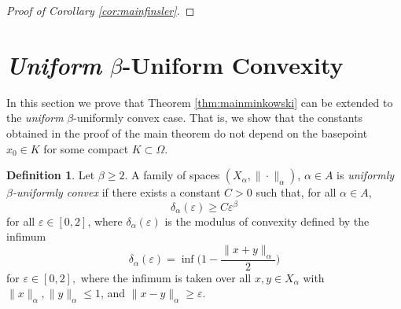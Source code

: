 \documentclass[letterpaper, 11pt, reqno]{amsart}
\theoremstyle{definition}
\newtheorem{dfn}[thm]{Definition}
\begin{document}
\begin{proof}[Proof of Corollary \ref{cor:mainfinsler}]

\end{proof}

\section{\textit{Uniform} $\beta$-Uniform Convexity}\label{sec:uniformuniform}

In this section we prove that Theorem \ref{thm:mainminkowski} can be extended to the \textit{uniform} $\beta$-uniformly convex case. That is, we show that the constants obtained in the proof of the main theorem do not depend on the basepoint $x_0 \in K$ for some compact $K \subset \Omega$.

\begin{dfn}
    Let $\beta \geq 2.$ A family of spaces $(X_\alpha, \|\cdot\|_\alpha)$,  $\alpha \in A$ is \textit{uniformly $\beta$-uniformly convex} if  there exists a constant $C > 0$  such that, for all $\alpha \in A$,
    \begin{equation*}
        \delta_\alpha(\varepsilon) \geq C\varepsilon^\beta
    \end{equation*}
    for all $\varepsilon \in [0,2]$, where $\delta_\alpha(\varepsilon)$ is the modulus of convexity defined by the infimum
    \begin{equation*}
        \delta_\alpha(\varepsilon) = \inf \bigg(1-\frac{\|x+y\|_\alpha}{2}\bigg)
    \end{equation*}
    for $\varepsilon \in [0,2],$ where the infimum is taken over all $x,y \in X_\alpha$ with $\|x\|_\alpha, \|y\|_\alpha \leq 1$, and $\|x-y\|_\alpha \geq \varepsilon$. 
\end{dfn}
\end{document}
